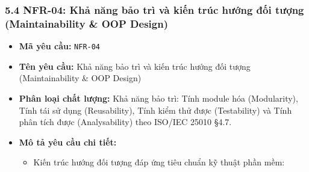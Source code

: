 \documentclass[11pt,a4paper]{article}
\providecommand{\tightlist}{
  \setlength{\itemsep}{0pt}\setlength{\parskip}{0pt}}
\begin{document}
\subsubsection{5.4 NFR-04: Khả năng bảo trì và kiến trúc hướng đối tượng
(Maintainability \& OOP
Design)}\label{54-nfr-04-khux1ea3-nux103ng-bux1ea3o-truxec-vuxe0-kiux1ebfn-truxfac-hux1b0ux1edbng-ux111ux1ed1i-tux1b0ux1ee3ng-maintainability--oop-design}

\begin{itemize}
\tightlist
\item
  \textbf{Mã yêu cầu:} \texttt{NFR-04}
\item
  \textbf{Tên yêu cầu:} Khả năng bảo trì và kiến trúc hướng đối tượng
  (Maintainability \& OOP Design)
\item
  \textbf{Phân loại chất lượng:} Khả năng bảo trì: Tính module hóa
  (Modularity), Tính tái sử dụng (Reusability), Tính kiểm thử được
  (Testability) và Tính phân tích được (Analysability) theo ISO/IEC
  25010 §4.7.
\item
  \textbf{Mô tả yêu cầu chi tiết:}

  \begin{itemize}
  \tightlist
  \item
    Kiến trúc hướng đối tượng đáp ứng tiêu chuẩn kỹ thuật phần mềm:


\end{itemize}
\end{itemize}
\end{document}
